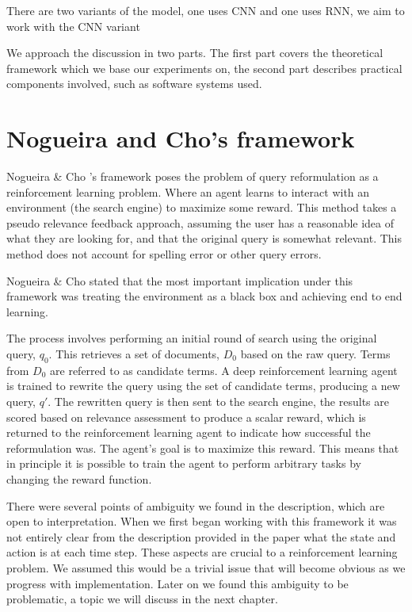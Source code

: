There are two variants of the model, one uses CNN and one uses RNN, we aim to work with the CNN variant 




We approach the discussion in two parts. The first part covers the theoretical framework which we base our experiments on, the second part describes practical components involved, such as software systems used. 



\section{Nogueira and Cho's framework}

Nogueira \& Cho \cite{nogueira2017task} 's framework poses the problem of query reformulation as a reinforcement learning problem. Where an agent learns to interact with an environment (the search engine) to maximize some reward. This method takes a pseudo relevance feedback approach, assuming the user has a reasonable idea of what they are looking for, and that the original query is somewhat relevant. This method does not account for spelling error or other query errors.

Nogueira \& Cho \cite{nogueira2017task}  stated that the most important implication under this framework was treating the environment as a black box and achieving end to end learning.

The process involves performing an initial round of search using the original query, $q_0$. This retrieves a set of documents, $D_0$ based on the raw query. Terms from $D_0$ are referred to as candidate terms.  A deep reinforcement learning agent is trained to rewrite the query using the set of candidate terms, producing a new query, $q'$. The rewritten query is then sent to the search engine, the results are scored based on relevance assessment to produce a scalar reward, which is returned to the reinforcement learning agent to indicate how successful the reformulation was.  The agent's goal is to maximize this reward.  This means that in principle it is possible to train the agent to perform arbitrary tasks by changing the reward function. 

There were several points of ambiguity we found in the description, which are open to interpretation. When we first began working with this framework it was not entirely clear from the description provided in the paper what the state and action is at each time step. These aspects are crucial to a reinforcement learning problem. We assumed this would be a trivial issue that will become obvious as we progress with implementation. Later on we found this ambiguity to be problematic, a topic we will discuss in the next chapter. 


